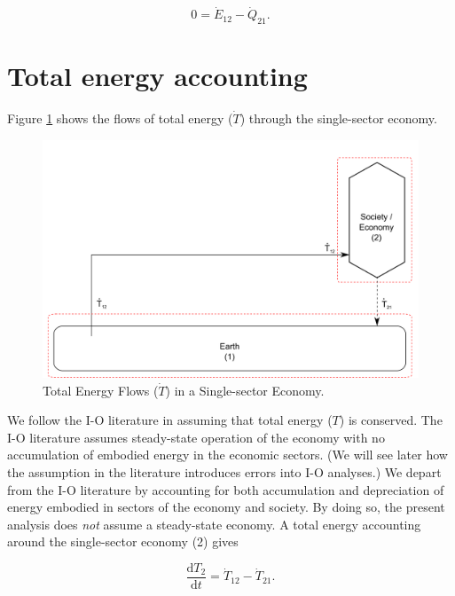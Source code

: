 \begin{equation} \label{eq:single_sector_direct_energy_no_accumulation}
	0 = \dot{E}_{12} - \dot{Q}_{21}.
\end{equation}

\section{Total energy accounting}

Figure \ref{fig:single_sector_flows_2} shows the flows of total energy ($\dot{T}$) through the single-sector economy.

\begin{figure}[h!]
\includegraphics[width=1.0\linewidth]{Chapter_Example_A/images/I-O_one_sector_total_energy.pdf}
\caption{Total Energy Flows ($\dot{T}$) in a Single-sector Economy.}
\label{fig:single_sector_flows_2}
\end{figure}

We follow the I-O literature in assuming that total energy ($T$) is conserved. The I-O literature assumes steady-state operation of the economy with no accumulation of embodied energy in the economic sectors. (We will see later how the assumption in the literature introduces errors into I-O analyses.) We depart from the I-O literature by accounting for both accumulation and depreciation of energy embodied in sectors of the economy and society. By doing so, the present analysis does \emph{not} assume a steady-state economy. A total energy accounting around the single-sector economy (2) gives

\begin{equation} \label{eq:single_sector_T_with_accumulation}
	\frac{\mathrm{d}T_{2}}{\mathrm{d}t} = \dot{T}_{12}  - \dot{T}_{21}.
\end{equation}

